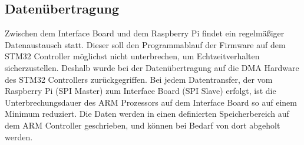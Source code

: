 \subsection{Datenübertragung}

Zwischen dem Interface Board und dem Raspberry Pi findet ein regelmäßiger Datenaustausch statt. Dieser soll den Programmablauf der Firmware auf dem STM32 Controller möglichst nicht unterbrechen, um Echtzeitverhalten sicherzustellen. Deshalb wurde bei der Datenübertragung auf die DMA Hardware des STM32 Controllers zurückgegriffen. Bei jedem Datentransfer, der vom Raspberry Pi (SPI Master) zum Interface Board (SPI Slave) erfolgt, ist die Unterbrechungsdauer des ARM Prozessors auf dem Interface Board so auf einem Minimum reduziert. Die Daten werden in einen definierten Speicherbereich auf dem ARM Controller geschrieben, und können bei Bedarf von dort abgeholt werden.







